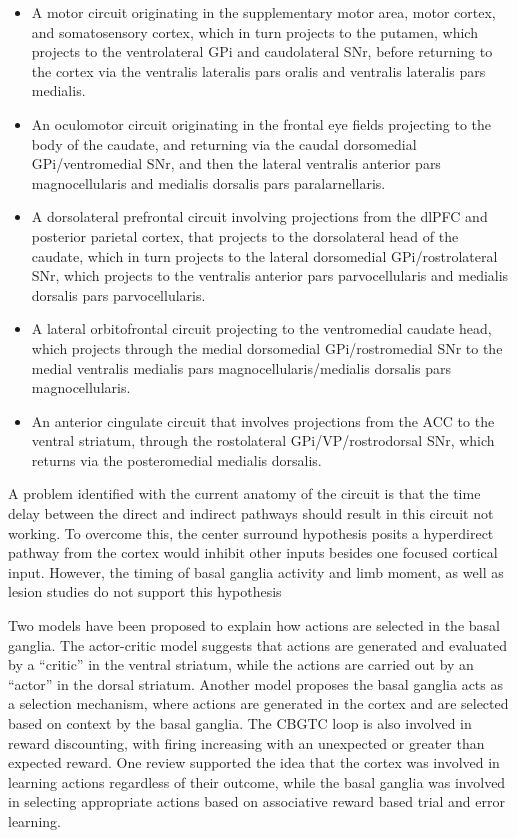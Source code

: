 \documentclass[]{book}
\providecommand{\tightlist}{%
  \setlength{\itemsep}{0pt}\setlength{\parskip}{0pt}}
\begin{document}
\begin{itemize}
\tightlist
\item
  A motor circuit originating in the supplementary motor area, motor cortex, and somatosensory cortex, which in turn projects to the putamen, which projects to the ventrolateral GPi and caudolateral SNr, before returning to the cortex via the ventralis lateralis pars oralis and ventralis lateralis pars medialis.
\item
  An oculomotor circuit originating in the frontal eye fields projecting to the body of the caudate, and returning via the caudal dorsomedial GPi/ventromedial SNr, and then the lateral ventralis anterior pars magnocellularis and medialis dorsalis pars paralarnellaris.
\item
  A dorsolateral prefrontal circuit involving projections from the dlPFC and posterior parietal cortex, that projects to the dorsolateral head of the caudate, which in turn projects to the lateral dorsomedial GPi/rostrolateral SNr, which projects to the ventralis anterior pars parvocellularis and medialis dorsalis pars parvocellularis.
\item
  A lateral orbitofrontal circuit projecting to the ventromedial caudate head, which projects through the medial dorsomedial GPi/rostromedial SNr to the medial ventralis medialis pars magnocellularis/medialis dorsalis pars magnocellularis.
\item
  An anterior cingulate circuit that involves projections from the ACC to the ventral striatum, through the rostolateral GPi/VP/rostrodorsal SNr, which returns via the posteromedial medialis dorsalis.
\end{itemize}

A problem identified with the current anatomy of the circuit is that the time delay between the direct and indirect pathways should result in this circuit not working. To overcome this, the center surround hypothesis posits a hyperdirect pathway from the cortex would inhibit other inputs besides one focused cortical input. However, the timing of basal ganglia activity and limb moment, as well as lesion studies do not support this hypothesis

Two models have been proposed to explain how actions are selected in the basal ganglia. The actor-critic model suggests that actions are generated and evaluated by a ``critic'' in the ventral striatum, while the actions are carried out by an ``actor'' in the dorsal striatum. Another model proposes the basal ganglia acts as a selection mechanism, where actions are generated in the cortex and are selected based on context by the basal ganglia. The CBGTC loop is also involved in reward discounting, with firing increasing with an unexpected or greater than expected reward. One review supported the idea that the cortex was involved in learning actions regardless of their outcome, while the basal ganglia was involved in selecting appropriate actions based on associative reward based trial and error learning.
\end{document}
